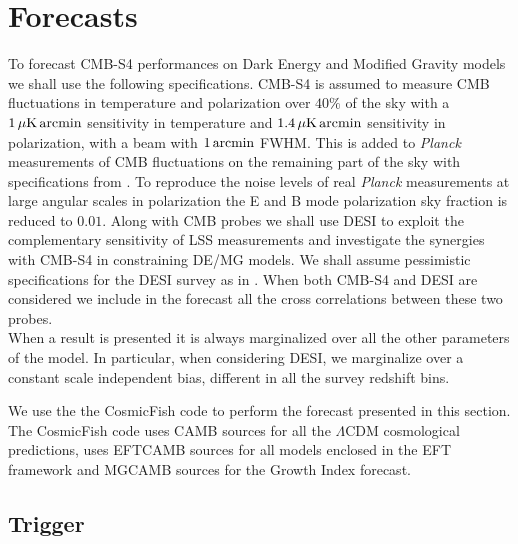 %

%
\section{Forecasts}
%

To forecast CMB-S4 performances on Dark Energy and Modified Gravity models we shall use the following specifications.
CMB-S4 is assumed to measure CMB fluctuations in temperature and polarization over $40 \%$ of the sky with a $1\,\mu {\rm K} \, {\rm arcmin}$ sensitivity in temperature and $1.4\,\mu {\rm K} \, {\rm arcmin}$ sensitivity in polarization, with a beam with $1\, {\rm arcmin}$ FWHM.
This is added to {\it Planck} measurements of CMB fluctuations on the remaining part of the sky with specifications from \cite{Adam:2015rua}. To reproduce the noise levels of real {\it Planck} measurements at large angular scales in polarization the E and B mode polarization sky fraction is reduced to $0.01$.
Along with CMB probes we shall use DESI to exploit the complementary sensitivity of LSS measurements and investigate the synergies with CMB-S4 in constraining DE/MG models.
We shall assume pessimistic specifications for the DESI survey as in \cite{Font-Ribera:2013rwa}.
When both CMB-S4 and DESI are considered we include in the forecast all the cross correlations between these two probes. \\
%
When a result is presented it is always marginalized over all the other parameters of the model. 
In particular, when considering DESI, we marginalize over a constant scale independent bias, different in all the survey redshift bins.
%

We use the the CosmicFish code \cite{Raveri:2016xof,Raveri:2016leq} to perform the forecast presented in this section. The CosmicFish code uses CAMB sources \cite{Lewis:1999bs,Challinor:2011bk} for all the $\Lambda$CDM cosmological predictions, uses EFTCAMB sources \cite{Hu:2013twa,Raveri:2014cka} for all models enclosed in the EFT framework and MGCAMB sources \cite{Zhao:2008bn,Hojjati:2011ix} for the Growth Index forecast.

\subsection{Trigger}

